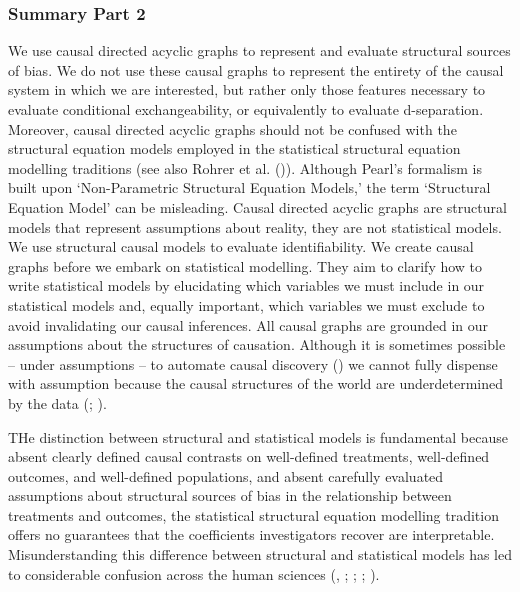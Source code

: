 \documentclass[
  single column]{article}
\begin{document}
\subsubsection{Summary Part 2}\label{summary-part-2}

We use causal directed acyclic graphs to represent and evaluate
structural sources of bias. We do not use these causal graphs to
represent the entirety of the causal system in which we are interested,
but rather only those features necessary to evaluate conditional
exchangeability, or equivalently to evaluate d-separation. Moreover,
causal directed acyclic graphs should not be confused with the
structural equation models employed in the statistical structural
equation modelling traditions (see also Rohrer et al.
()). Although Pearl's formalism is
built upon `Non-Parametric Structural Equation Models,' the term
`Structural Equation Model' can be misleading. Causal directed acyclic
graphs are structural models that represent assumptions about reality,
they are not statistical models. We use structural causal models to
evaluate identifiability. We create causal graphs before we embark on
statistical modelling. They aim to clarify how to write statistical
models by elucidating which variables we must include in our statistical
models and, equally important, which variables we must exclude to avoid
invalidating our causal inferences. All causal graphs are grounded in
our assumptions about the structures of causation. Although it is
sometimes possible -- under assumptions -- to automate causal discovery
() we cannot fully
dispense with assumption because the causal structures of the world are
underdetermined by the data (; ).

THe distinction between structural and statistical models is fundamental
because absent clearly defined causal contrasts on well-defined
treatments, well-defined outcomes, and well-defined populations, and
absent carefully evaluated assumptions about structural sources of bias
in the relationship between treatments and outcomes, the statistical
structural equation modelling tradition offers no guarantees that the
coefficients investigators recover are interpretable. Misunderstanding
this difference between structural and statistical models has led to
considerable confusion across the human sciences
(,
;
;
;
).
\end{document}
